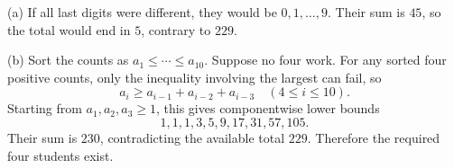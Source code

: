(a) If all last digits were different, they would be $0,1,\ldots,9$. Their sum is $45$, so the total would end in $5$, contrary to $229$.

(b) Sort the counts as $a_1\le\cdots\le a_{10}$. Suppose no four work. For any sorted four positive counts, only the inequality involving the largest can fail, so
\[
a_i\ge a_{i-1}+a_{i-2}+a_{i-3}\quad(4\le i\le10).
\]
Starting from $a_1,a_2,a_3\ge1$, this gives componentwise lower bounds
\[
1,1,1,3,5,9,17,31,57,105.
\]
Their sum is $230$, contradicting the available total $229$. Therefore the required four students exist.
